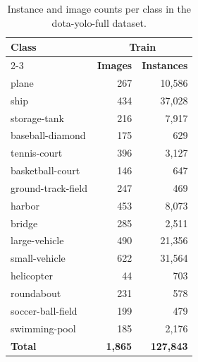\begin{table}[htbp]
\centering
\caption{Instance and image counts per class in the dota-yolo-full dataset.}
\label{tab:dota_yolo_full_counts}
\begin{tabular}{lrr}
\toprule
\textbf{Class} & \multicolumn{2}{c}{Train} \\
\cmidrule(lr){2-3}
 & \textbf{Images} & \textbf{Instances} \\
\midrule
plane & 267 & 10,586 \\
ship & 434 & 37,028 \\
storage-tank & 216 & 7,917 \\
baseball-diamond & 175 & 629 \\
tennis-court & 396 & 3,127 \\
basketball-court & 146 & 647 \\
ground-track-field & 247 & 469 \\
harbor & 453 & 8,073 \\
bridge & 285 & 2,511 \\
large-vehicle & 490 & 21,356 \\
small-vehicle & 622 & 31,564 \\
helicopter & 44 & 703 \\
roundabout & 231 & 578 \\
soccer-ball-field & 199 & 479 \\
swimming-pool & 185 & 2,176 \\
\midrule
\textbf{Total} & \textbf{1,865} & \textbf{127,843} \\
\bottomrule
\end{tabular}
\end{table}

